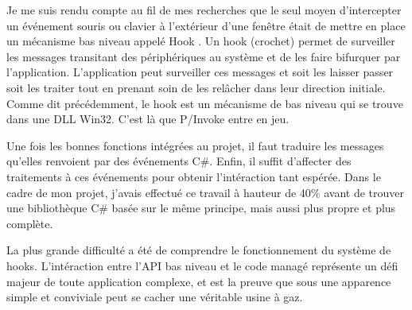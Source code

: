 Je me suis rendu compte au fil de mes recherches que le seul moyen d'intercepter un événement souris ou clavier à l'extérieur d'une fenêtre était de mettre en place un mécanisme bas niveau appelé \og Hook \fg{}. Un hook (crochet) permet de surveiller les messages transitant des périphériques au système et de les faire bifurquer par l'application. L'application peut surveiller ces messages et soit les laisser passer soit les traiter tout en prenant soin de les relâcher dans leur direction initiale. Comme dit précédemment, le hook est un mécanisme de bas niveau qui se trouve dans une DLL Win32. C'est là que P/Invoke entre en jeu.

Une fois les bonnes fonctions intégrées au projet, il faut traduire les messages qu'elles renvoient par des événements C\#. Enfin, il suffit d'affecter des traitements à ces événements pour obtenir l'intéraction tant espérée. Dans le cadre de mon projet, j'avais effectué ce travail à hauteur de 40\% avant de trouver une bibliothèque C\# basée sur le même principe, mais aussi plus propre et plus complète.

La plus grande difficulté a été de comprendre le fonctionnement du système de hooks. L'intéraction entre l'API bas niveau et le code managé représente un défi majeur de toute application complexe, et est la preuve que sous une apparence simple et conviviale peut se cacher une véritable usine à gaz.